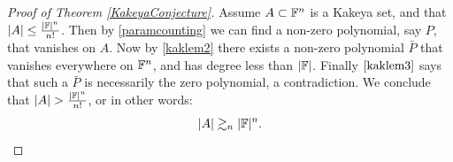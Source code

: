 \begin{proof} [Proof of Theorem \ref{KakeyaConjecture}] 
Assume $A \subset \mathbb F^n$ is a Kakeya set, and that $|A| \leq \frac{|\mathbb F|^n}{n!}$. Then by \ref{paramcounting} we can find a 
non-zero polynomial, say $P$, that vanishes on $A$. Now by \ref{kaklem2} there exists a non-zero polynomial $\bar{P}$ that vanishes everywhere on $\mathbb F^n$, and has degree less than $|\mathbb F|$.
Finally $\ref{kaklem3}$ says that such a $\bar{P}$ is necessarily the zero polynomial, a contradiction. We conclude that $|A| > \frac{|\mathbb F|^n}{n!}$, or in other words:
$$
|A| \gtrsim_n |\mathbb F|^n.
$$
\end{proof}